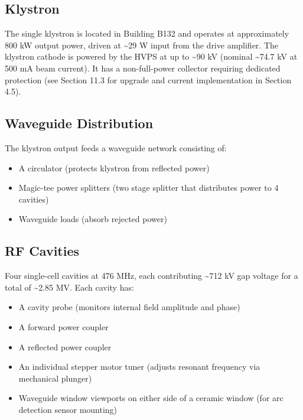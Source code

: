 {\subsection{Klystron}\label{klystron}

The single klystron is located in Building B132 and operates at approximately 800 kW output power, driven at \textasciitilde29 W input from the drive amplifier. The klystron cathode is powered by the HVPS at up to \textasciitilde90 kV (nominal \textasciitilde74.7 kV at 500 mA beam current). It has a non-full-power collector requiring dedicated protection (see Section 11.3 for upgrade and current implementation in Section 4.5).

\subsection{Waveguide Distribution}\label{waveguide-distribution}

The klystron output feeds a waveguide network consisting of:

\begin{itemize}
\tightlist
\item
  A circulator (protects klystron from reflected power)
\item
  Magic-tee power splitters (two stage splitter that distributes power to 4 cavities)
\item
  Waveguide loads (absorb rejected power)
\end{itemize}

\subsection{RF Cavities}\label{rf-cavities}

Four single-cell cavities at 476 MHz, each contributing \textasciitilde712 kV gap voltage for a total of \textasciitilde2.85 MV. Each cavity has:

\begin{itemize}
\tightlist
\item
  A cavity probe (monitors internal field amplitude and phase)
\item
  A forward power coupler
\item
  A reflected power coupler
\item
  An individual stepper motor tuner (adjusts resonant frequency via mechanical plunger)
\item
  Waveguide window viewports on either side of a ceramic window (for arc detection sensor mounting)
\end{itemize}

}
